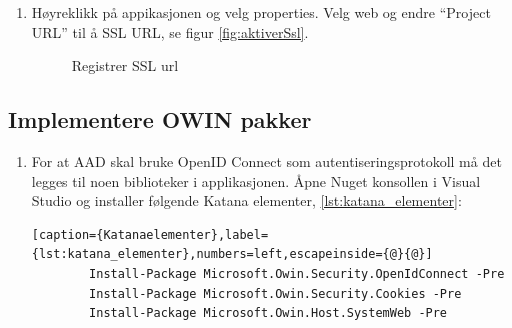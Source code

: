 \begin{enumerate}
  \item Høyreklikk på appikasjonen og velg properties. Velg web og endre “Project URL” til å SSL URL, se figur \ref{fig:aktiverSsl}.
  \pagebreak
    \begin{figure}[!htbp]
        \begin{center}
             {%
            \setlength{\fboxsep}{0pt}%
            \setlength{\fboxrule}{0.8pt}%
            }%
            \caption{Registrer SSL url}
            \label{fig:registrerSslUrl}
        \end{center}
    \end{figure}
\end{enumerate}

\subsection*{Implementere OWIN pakker}

\begin{enumerate}
  \item For at AAD skal bruke OpenID Connect som autentiseringsprotokoll må det legges til noen biblioteker i applikasjonen. Åpne Nuget konsollen i Visual Studio og installer følgende Katana elementer, \ref{lst:katana_elementer}:
    \begin{lstlisting}[caption={Katanaelementer},label={lst:katana_elementer},numbers=left,escapeinside={@}{@}]
        Install-Package Microsoft.Owin.Security.OpenIdConnect -Pre
        Install-Package Microsoft.Owin.Security.Cookies -Pre
        Install-Package Microsoft.Owin.Host.SystemWeb -Pre
    \end{lstlisting}
\end{enumerate}


